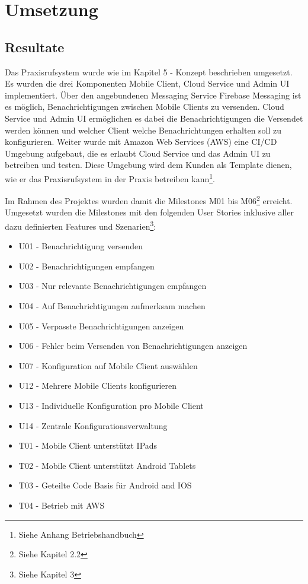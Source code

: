 \section{Umsetzung}\label{sec:umsetzung}

\subsection{Resultate}

Das Praxisrufsystem wurde wie im Kapitel 5 - Konzept beschrieben umgesetzt.
Es wurden die drei Komponenten Mobile Client, Cloud Service und Admin UI implementiert.
Über den angebundenen Messaging Service Firebase Messaging ist es möglich, Benachrichtigungen zwischen Mobile Clients zu versenden.
Cloud Service und Admin UI ermöglichen es dabei die Benachrichtigungen die Versendet werden können und welcher Client welche Benachrichtungen erhalten soll zu konfigurieren.
Weiter wurde mit Amazon Web Services (AWS) eine CI/CD Umgebung aufgebaut, die es erlaubt Cloud Service und das Admin UI zu betreiben und testen.
Diese Umgebung wird dem Kunden als Template dienen, wie er das Praxisrufsystem in der Praxis betreiben kann\footnote{Siehe Anhang Betriebshandbuch}.

Im Rahmen des Projektes wurden damit die Milestones M01 bis M06\footnote{Siehe Kapitel 2.2} erreicht.
Umgesetzt wurden die Milestones mit den folgenden User Stories inklusive aller dazu definierten Features und Szenarien\footnote{Siehe Kapitel 3}:

\begin{itemize}
    \item U01 - Benachrichtigung versenden
    \item U02 - Benachrichtigungen empfangen
    \item U03 - Nur relevante Benachrichtigungen empfangen
    \item U04 - Auf Benachrichtigungen aufmerksam machen
    \item U05 - Verpasste Benachrichtigungen anzeigen
    \item U06 - Fehler beim Versenden von Benachrichtigungen anzeigen
    \item U07 - Konfiguration auf Mobile Client auswählen
    \item U12 - Mehrere Mobile Clients konfigurieren
    \item U13 - Individuelle Konfiguration pro Mobile Client
    \item U14 - Zentrale Konfigurationsverwaltung
    \item T01 - Mobile Client unterstützt IPads
    \item T02 - Mobile Client unterstützt Android Tablets
    \item T03 - Geteilte Code Basis für Android and IOS
    \item T04 - Betrieb mit AWS
\end{itemize}

